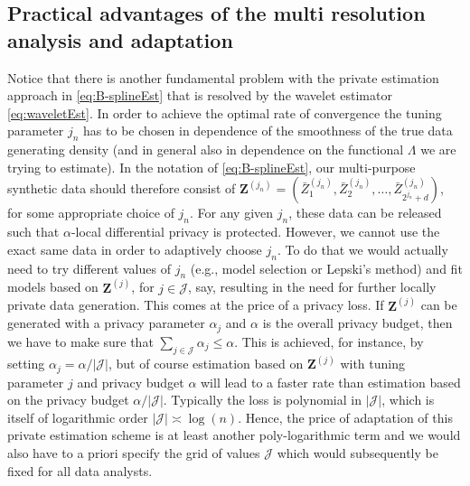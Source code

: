 \documentclass[preprint]{imsart}
\numberwithin{equation}{section}
\begin{document}
\subsection{Practical advantages of the multi resolution analysis and adaptation}

Notice that there is another fundamental problem with the private estimation approach in \eqref{eq:B-splineEst} that is resolved by the wavelet estimator \eqref{eq:waveletEst}. In order to achieve the optimal rate of convergence the tuning parameter $j_n$ has to be chosen in dependence of the smoothness of the true data generating density (and in general also in dependence on the functional $\Lambda$ we are trying to estimate). In the notation of \eqref{eq:B-splineEst}, our multi-purpose synthetic data should therefore consist of $\mathbf{Z}^{(j_n)} = (\bar{Z}_1^{(j_n)}, \bar{Z}_2^{(j_n)}, \dots, \bar{Z}_{2^{j_n}+d}^{(j_n)})$, for some appropriate choice of $j_n$. For any given $j_n$, these data can be released such that $\alpha$-local differential privacy is protected. However, we cannot use the exact same data in order to adaptively choose $j_n$. To do that we would actually need to try different values of $j_n$ (e.g., model selection or Lepski's method) and fit models based on $\mathbf{Z}^{(j)}$, for $j\in\mathcal J$, say, resulting in the need for further locally private data generation. This comes at the price of a privacy loss. If $\mathbf{Z}^{(j)}$ can be generated with a privacy parameter $\alpha_j$ and $\alpha$ is the overall privacy budget, then we have to make sure that $\sum_{j\in\mathcal J}\alpha_j\le \alpha$. This is achieved, for instance, by setting $\alpha_j=\alpha/|\mathcal J|$, but of course estimation based on $\mathbf{Z}^{(j)}$ with tuning parameter $j$ and privacy budget $\alpha$ will lead to a faster rate than estimation based on the privacy budget $\alpha/|\mathcal J|$. Typically the loss is polynomial in $|\mathcal J|$, which is itself of logarithmic order $|\mathcal J| \asymp \log(n)$. Hence, the price of adaptation of this private estimation scheme is at least another poly-logarithmic term and we would also have to a priori specify the grid of values $\mathcal J$ which would subsequently be fixed for all data analysts. 
\end{document}
